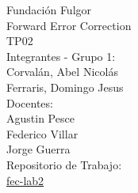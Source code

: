 \begin{titlepage}

\thispagestyle{empty}


\begin{center}
    \vspace{5pt}
    \LARGE Fundación Fulgor\\[0.5cm] 
    \large Forward Error Correction \\[0.5cm] 
    \large TP02
    \\[0.2cm]
    \vspace{60pt}
    \large Integrantes - Grupo 1:\\
    \normalsize Corvalán, Abel Nicolás\\
    \normalsize Ferraris, Domingo Jesus\\
    \vspace{20pt}
    \large Docentes:\\
    \normalsize Agustin Pesce\\
    \normalsize Federico Villar\\
    \normalsize Jorge Guerra\\
    \vspace{20pt}
    \large Repositorio de Trabajo:\\
    \href{https://github.com/AbelCorvalan0/fec-lab2}{fec-lab2}
    \vfill
\end{center}

\end{titlepage}
